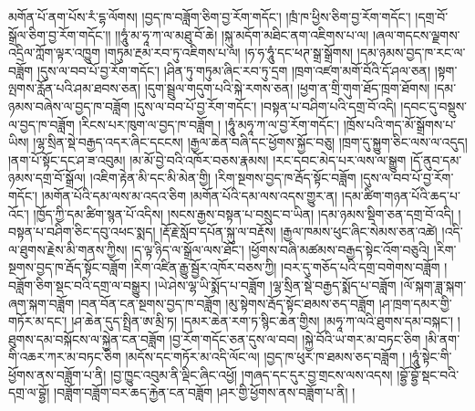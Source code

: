 མགོན་པོ་ནག་པོས་རཾ་དྷ་ལོགས། །བྱད་ཁ་བཟློག་ཅིག་བྱ་རོག་གདོང་། །ཁྲཾ་ཁ་ཕྱིས་ཅིག་བྱ་རོག་གདོང་། །དགྲ་བོ་སྒྲོལ་ཅིག་བྱ་རོག་གདོང་།། །།ཧཱུཾ་མ་ཧཱ་ཀ་ལ་མཐུ་བོ་ཆེ། །སྐུ་མདོག་མཐིང་ནག་འཇིགས་པ་ལ། །ཞལ་གདངས་ལྗགས་འདྲིལ་ཀློག་ལྟར་འཁྱུག །གཏུམ་རྔམ་རབ་ཏུ་འཇིགས་པ་ལ། །ཧ་ཧ་ཧཱུཾ་དང་ཕཊ་སྒྲ་སྒྲོགས། །དམ་ཉམས་བྱད་ཁ་རང་ལ་བཟློག །དུས་ལ་བབ་པོ་བྱ་རོག་གདོང་། །ཤིན་ཏུ་གཏུམ་ཞིང་རབ་ཏུ་དྲག །ཁྲག་འཛག་མགོ་བོའི་དོ་ཤལ་ཅན། །སྟག་ལྤགས་རློན་པའི་ཤམ་ཐབས་ཅན། །དུག་སྦྲུལ་གདུག་པའི་སྐེ་རགས་ཅན། །ཕྱག་ན་གྲི་གུག་ཐོད་ཁྲག་ཐོགས། །དམ་ཉམས་བཞེས་ལ་བྱད་ཁ་བཟློག །དུས་ལ་བབ་པོ་བྱ་རོག་གདོང་། །བསྟན་པ་བཤིག་པའི་དགྲ་བོ་འདི། །དབང་དུ་བསྡུས་ལ་བྱད་ཁ་བཟློག །རིངས་པར་ཁུག་ལ་བྱད་ཁ་བཟློག ། །ཧཱུཾ་མཧཱ་ཀ་ལ་བྱ་རོག་གདོང་། །ཁྲོས་པའི་གད་མོ་སྒྲོགས་པ་ཡིས། །ལྷ་སྲིན་སྡེ་བརྒྱད་འདར་ཞིང་དངངས། །རྒྱལ་ཆེན་བཞི་དང་ཕྱོགས་སྐྱོང་བཅུ། །ཁྲག་དུ་སྐྱུག་ཅིང་ལས་ལ་འདུད། །ནག་པོ་སྟོང་དང་ཤ་ཟ་འབུམ། །མ་མོ་བྱེ་བའི་འཁོར་བཅས་རྣམས། །རང་དབང་མེད་པར་ལས་ལ་སྒྱུག །དོ་ནུབ་དམ་ཉམས་དགྲ་བོ་སྒྲོལ། །འཇིག་རྟེན་མི་དང་མི་མེན་གྱི། །རིག་སྔགས་བྱད་ཁ་རྦོད་སྟོང་བཟློག །དུས་ལ་བབ་པོ་བྱ་རོག་གདོང་། །མགོན་པོའི་དམ་ལས་མ་འདའ་ཅིག །མགོན་པོའི་དམ་ལས་འདས་གྱུར་ན། །དམ་ཚིག་གཉན་པོའི་ཆད་པ་འོང་། །ཁྱོད་ཀྱི་དམ་ཚིག་སྙན་པོ་འདིས། །སངས་རྒྱས་བསྟན་པ་བསྲུང་བ་ཡིན། །དམ་ཉམས་སྡིག་ཅན་དགྲ་བོ་འདི། །བསྟན་པ་བཤིག་ཅིང་དབུ་འཕང་སྨད། །རྡོ་རྗེ་སློབ་དཔོན་སྐུ་ལ་བརྡོས། །རྒྱལ་ཁམས་ཕུང་ཞིང་སེམས་ཅན་འཚེ། །འདི་ལ་ཐུགས་རྗེས་མི་གནས་ཀྱིས། །ད་ལྟ་ཉིད་ལ་སྒྲོལ་ལས་ཐོང་། །ཕྱོགས་བཞི་མཚམས་བརྒྱད་སྟེང་འོག་བཅུའི། །རིག་སྔགས་བྱད་ཁ་རྦོད་སྟོང་བཟློག །རིག་འཛིན་རྒྱུ་སྦྱོར་འཁོར་བཅས་ཀྱི། །བར་དུ་གཅོད་པའི་དགྲ་བགེགས་བཟློག །བཟློག་ཅིག་སྡང་བའི་དགྲ་ལ་བསྒྱུར། །ཡེ་ཤེས་ལྷ་ཡི་སྨོད་པ་བཟློག །ལྷ་སྲིན་སྡེ་བརྒྱད་སྨོད་པ་བཟློག །ལོ་སྐག་ཟླ་སྐག་ཞག་སྐག་བཟློག །བན་བོན་ངན་སྔགས་བྱད་ཁ་བཟློག །མུ་སྟེགས་རྦོད་སྟོང་ཐམས་ཅད་བཟློག །ཤ་ཁྲག་དམར་གྱི་གཏོར་མ་དང་། །ཤ་ཆེན་དུད་སྤྲིན་ཨ་མྲི་ཏ། །དམར་ཆེན་རག་ཏ་སྙིང་ཆེན་གྱིས། །མཧཱ་ཀ་ལའི་ཐུགས་དམ་བསྐང་། །ཐུགས་དམ་བསྐོངས་ལ་སྐྱེན་ངན་བཟློག །བྱ་རོག་གདོང་ཅན་དུས་ལ་བབ། །སྐྱེ་བོའི་ཡ་གར་མ་བཏང་ཅིག །མི་ནག་གི་འཆར་ཀར་མ་བཏང་ཅིག །མདོས་དང་གཏོར་མ་འདི་ལོང་ལ། །བྱད་ཁ་ཕུར་ཁ་ཐམས་ཅད་བཟློག ། །ཧཱུཾ་སྟེང་གི་ཕྱོགས་ནས་བཟློག་པ་ནི། །བྱ་ཁྱུང་འབུམ་ནི་ལྡིང་ཞིང་འཕྱོ། །གཞད་དང་དུར་བྱ་གྲངས་ལས་འདས། །བྷྱོ་བྷྱོ་སྡང་བའི་དགྲ་ལ་བྷྱོ། །བཟློག་བཟློག་བར་ཆད་རྐྱེན་ངན་བཟློག །ཤར་གྱི་ཕྱོགས་ནས་བཟློག་པ་ནི། །
